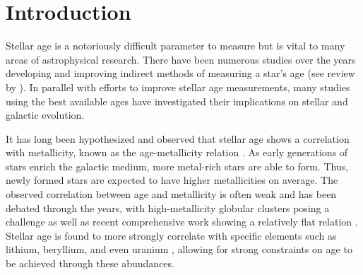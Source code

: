 \documentclass[twocolumn,linenumbers]{aastex631}
\begin{document}
\title{}


\author[0000-0003-3868-1123]{Tyler M. Heintz}

\author[0000-0001-5941-2286]{J. J. Hermes}

\author[0000-0002-4284-8638]{Jennifer L. van Saders}


\begin{abstract}

\end{abstract}

\section{Introduction}\label{sec:chap4_intro}
Stellar age is a notoriously difficult parameter to measure but is vital to many areas of astrophysical research. There have been numerous studies over the years developing and improving indirect methods of measuring a star's age (see review by \citealt{2010ARA&A..48..581S}). In parallel with efforts to improve stellar age measurements, many studies using the best available ages have investigated their implications on stellar and galactic evolution. 

It has long been hypothesized and observed that stellar age shows a correlation with metallicity, known as the age-metallicity relation \citep[AMR, ][]{1974A&A....32..321M, 1993A&A...275..101E}. As early generations of stars enrich the galactic medium, more metal-rich stars are able to form. Thus, newly formed stars are expected to have higher metallicities on average. The observed correlation between age and metallicity is often weak and has been debated through the years, with high-metallicity globular clusters posing a challenge \citep[e.g. NGC 6791, ][]{2015ApJ...799..202B} as well as recent comprehensive work showing a relatively flat relation \citep{2014A&A...565A..89B, 2021MNRAS.501.4917W}. Stellar age is found to more strongly correlate with specific elements such as lithium, beryllium, and even uranium \citep[e.g.,][]{2023ApJ...948..122S}, allowing for strong constraints on age to be achieved through these abundances.
\end{document}
